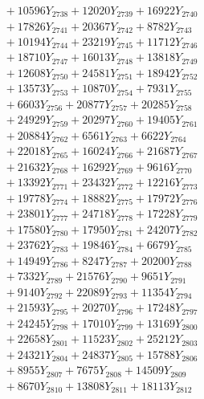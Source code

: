 \documentclass[a4paper,10pt]{article}
\begin{document}
{\begin{align}
&\;  + 10596 Y_{2738} + 12020 Y_{2739} + 16922 Y_{2740} \\[0.3ex]
&\;  + 17826 Y_{2741} + 20367 Y_{2742} + 8782 Y_{2743} \\[0.3ex]
&\;  + 10194 Y_{2744} + 23219 Y_{2745} + 11712 Y_{2746} \\[0.3ex]
&\;  + 18710 Y_{2747} + 16013 Y_{2748} + 13818 Y_{2749} \\[0.3ex]
&\;  + 12608 Y_{2750} + 24581 Y_{2751} + 18942 Y_{2752} \\[0.3ex]
&\;  + 13573 Y_{2753} + 10870 Y_{2754} + 7931 Y_{2755} \\[0.3ex]
&\;  + 6603 Y_{2756} + 20877 Y_{2757} + 20285 Y_{2758} \\[0.5ex]\allowbreak
&\;  + 24929 Y_{2759} + 20297 Y_{2760} + 19405 Y_{2761} \\[0.3ex]
&\;  + 20884 Y_{2762} + 6561 Y_{2763} + 6622 Y_{2764} \\[0.3ex]
&\;  + 22018 Y_{2765} + 16024 Y_{2766} + 21687 Y_{2767} \\[0.3ex]
&\;  + 21632 Y_{2768} + 16292 Y_{2769} + 9616 Y_{2770} \\[0.3ex]
&\;  + 13392 Y_{2771} + 23432 Y_{2772} + 12216 Y_{2773} \\[0.3ex]
&\;  + 19778 Y_{2774} + 18882 Y_{2775} + 17972 Y_{2776} \\[0.3ex]
&\;  + 23801 Y_{2777} + 24718 Y_{2778} + 17228 Y_{2779} \\[0.3ex]
&\;  + 17580 Y_{2780} + 17950 Y_{2781} + 24207 Y_{2782} \\[0.3ex]
&\;  + 23762 Y_{2783} + 19846 Y_{2784} + 6679 Y_{2785} \\[0.3ex]
&\;  + 14949 Y_{2786} + 8247 Y_{2787} + 20200 Y_{2788} \\[0.5ex]\allowbreak
&\;  + 7332 Y_{2789} + 21576 Y_{2790} + 9651 Y_{2791} \\[0.3ex]
&\;  + 9140 Y_{2792} + 22089 Y_{2793} + 11354 Y_{2794} \\[0.3ex]
&\;  + 21593 Y_{2795} + 20270 Y_{2796} + 17248 Y_{2797} \\[0.3ex]
&\;  + 24245 Y_{2798} + 17010 Y_{2799} + 13169 Y_{2800} \\[0.3ex]
&\;  + 22658 Y_{2801} + 11523 Y_{2802} + 25212 Y_{2803} \\[0.3ex]
&\;  + 24321 Y_{2804} + 24837 Y_{2805} + 15788 Y_{2806} \\[0.3ex]
&\;  + 8955 Y_{2807} + 7675 Y_{2808} + 14509 Y_{2809} \\[0.3ex]
&\;  + 8670 Y_{2810} + 13808 Y_{2811} + 18113 Y_{2812} \\[0.3ex]

\end{align}}
\end{document}
